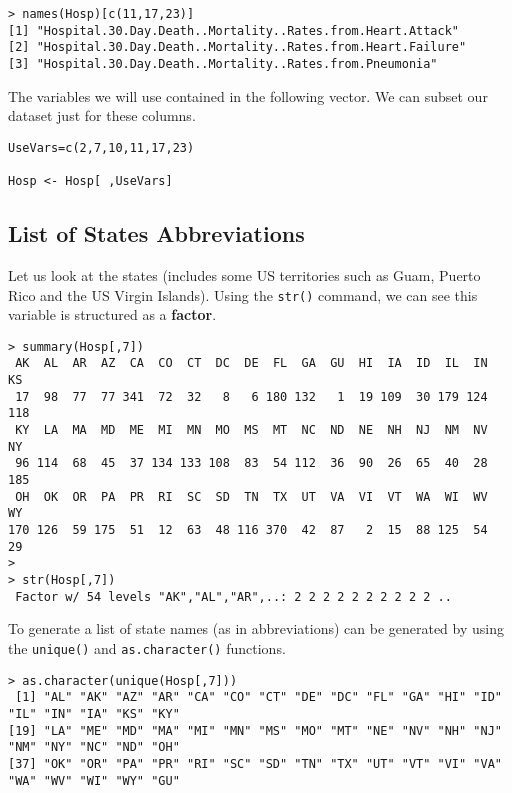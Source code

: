 \documentclass[]{article}
\begin{document}
\begin{verbatim}
> names(Hosp)[c(11,17,23)]
[1] "Hospital.30.Day.Death..Mortality..Rates.from.Heart.Attack" 
[2] "Hospital.30.Day.Death..Mortality..Rates.from.Heart.Failure"
[3] "Hospital.30.Day.Death..Mortality..Rates.from.Pneumonia" 
\end{verbatim}

The variables we will use contained in the following vector. We can subset our dataset just for these columns.

\begin{framed}
\begin{verbatim}
UseVars=c(2,7,10,11,17,23)

Hosp <- Hosp[ ,UseVars]
\end{verbatim}
\end{framed}

\newpage
\subsection{List of States Abbreviations}
\noindent Let us look at the states (includes some US territories such as Guam, Puerto Rico and the US Virgin Islands). Using the \texttt{str()} command, we can see this variable is structured as a \textbf{factor}.
\begin{verbatim}
> summary(Hosp[,7])
 AK  AL  AR  AZ  CA  CO  CT  DC  DE  FL  GA  GU  HI  IA  ID  IL  IN  KS 
 17  98  77  77 341  72  32   8   6 180 132   1  19 109  30 179 124 118 
 KY  LA  MA  MD  ME  MI  MN  MO  MS  MT  NC  ND  NE  NH  NJ  NM  NV  NY 
 96 114  68  45  37 134 133 108  83  54 112  36  90  26  65  40  28 185 
 OH  OK  OR  PA  PR  RI  SC  SD  TN  TX  UT  VA  VI  VT  WA  WI  WV  WY 
170 126  59 175  51  12  63  48 116 370  42  87   2  15  88 125  54  29
>
> str(Hosp[,7])
 Factor w/ 54 levels "AK","AL","AR",..: 2 2 2 2 2 2 2 2 2 2 ..
\end{verbatim}

To generate a list of state names (as in abbreviations) can be generated by using the \texttt{unique()} and \texttt{as.character()} functions.
\begin{verbatim}
> as.character(unique(Hosp[,7]))
 [1] "AL" "AK" "AZ" "AR" "CA" "CO" "CT" "DE" "DC" "FL" "GA" "HI" "ID" "IL" "IN" "IA" "KS" "KY"
[19] "LA" "ME" "MD" "MA" "MI" "MN" "MS" "MO" "MT" "NE" "NV" "NH" "NJ" "NM" "NY" "NC" "ND" "OH"
[37] "OK" "OR" "PA" "PR" "RI" "SC" "SD" "TN" "TX" "UT" "VT" "VI" "VA" "WA" "WV" "WI" "WY" "GU"
\end{verbatim}
\end{document}
